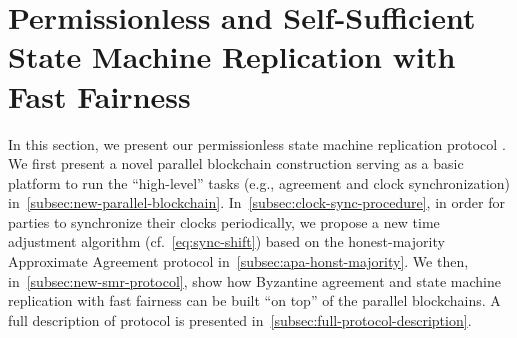 \section{Permissionless and Self-Sufficient State Machine Replication with Fast Fairness}
\label{sec:permissionless-smr}

In this section, we present our permissionless state machine replication protocol \pSMR.
% 
We first present a novel parallel blockchain construction serving as a basic platform to run the ``high-level'' tasks (e.g., agreement and clock synchronization) in~\cref{subsec:new-parallel-blockchain}.
%
In~\cref{subsec:clock-sync-procedure}, in order for parties to synchronize their clocks periodically,  we propose a new time adjustment algorithm (cf.~\cref{eq:sync-shift}) based on the honest-majority Approximate Agreement protocol in~\cref{subsec:apa-honst-majority}.
%
We then, in~\cref{subsec:new-smr-protocol}, show how Byzantine agreement and state machine replication with fast fairness can be built ``on top'' of the parallel blockchains.
%
A full description of protocol \pSMR is presented in~\cref{subsec:full-protocol-description}.





